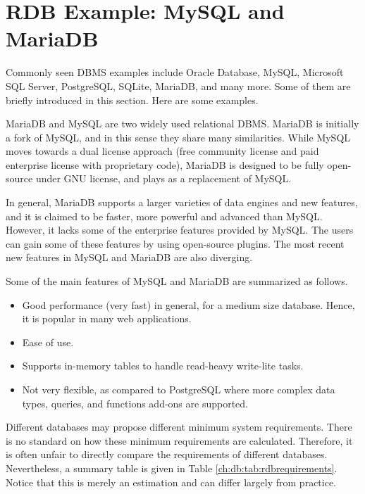 \section{RDB Example: MySQL and MariaDB} \label{ch:db:sec:mariadb}

Commonly seen DBMS examples include Oracle Database, MySQL, Microsoft SQL Server, PostgreSQL, SQLite, MariaDB, and many more. Some of them are briefly introduced in this section. Here are some examples.

MariaDB and MySQL are two widely used relational DBMS. MariaDB is initially a fork of MySQL, and in this sense they share many similarities. While MySQL moves towards a dual license approach (free community license and paid enterprise license with proprietary code), MariaDB is designed to be fully open-source under GNU license, and plays as a replacement of MySQL.

In general, MariaDB supports a larger varieties of data engines and new features, and it is claimed to be faster, more powerful and advanced than MySQL. However, it lacks some of the enterprise features provided by MySQL. The users can gain some of these features by using open-source plugins. The most recent new features in MySQL and MariaDB are also diverging.

Some of the main features of MySQL and MariaDB are summarized as follows.
\begin{itemize}
	\item Good performance (very fast) in general, for a medium size database. Hence, it is popular in many web applications.
	\item Ease of use.
	\item Supports in-memory tables to handle read-heavy write-lite tasks.
	\item Not very flexible, as compared to PostgreSQL where more complex data types, queries, and functions add-ons are supported.
\end{itemize}

Different databases may propose different minimum system requirements. There is no standard on how these minimum requirements are calculated. Therefore, it is often unfair to directly compare the requirements of different databases. Nevertheless, a summary table is given in Table \ref{ch:db:tab:rdbrequirements}. Notice that this is merely an estimation and can differ largely from practice.

